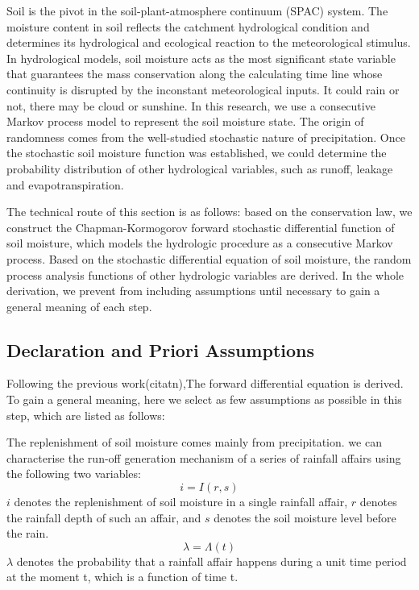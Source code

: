 \documentclass[11pt]{article}
\begin{document}
 
Soil is the pivot in the soil-plant-atmosphere continuum (SPAC) system. The moisture content in soil reflects the catchment hydrological condition and determines its hydrological and ecological reaction to the meteorological stimulus. In hydrological models, soil moisture acts as the most significant state variable that guarantees the mass conservation along the calculating time line whose continuity is disrupted by the inconstant meteorological inputs. It could rain or not, there may be cloud or sunshine. In this research, we use a consecutive Markov process model to represent the soil moisture state. The origin of randomness comes from the well-studied stochastic nature of precipitation. Once the stochastic soil moisture function was established, we could determine the probability distribution of other hydrological variables, such as runoff, leakage and evapotranspiration.

The technical route of this section is as follows: based on the conservation law, we construct the Chapman-Kormogorov forward stochastic differential function of soil moisture, which models the hydrologic procedure as a consecutive Markov process.  Based on the stochastic differential equation of soil moisture, the random process analysis functions of other hydrologic variables are derived. In the whole derivation, we prevent from  including assumptions until necessary to gain a general meaning of each step.

\subsection{Declaration and Priori Assumptions}
Following the previous work(citatn),The forward differential equation is derived. To gain a general meaning, here we select as few assumptions as possible in this step, which are listed as follows:

The replenishment of soil moisture comes mainly from  precipitation. we can characterise the run-off generation mechanism of a series of rainfall affairs using the following two variables:
\begin{equation}
i=I(r,s)
\end{equation}
$i$ denotes the replenishment of soil moisture in a single rainfall affair, $r$ denotes the rainfall depth of such an affair, and $s$ denotes the soil moisture level before the rain.
\begin{equation}
\lambda=\Lambda(t)
\end{equation}
$\lambda$ denotes the probability that a rainfall affair happens during a unit time period at the moment t, which is a function of time t.
\end{document}
